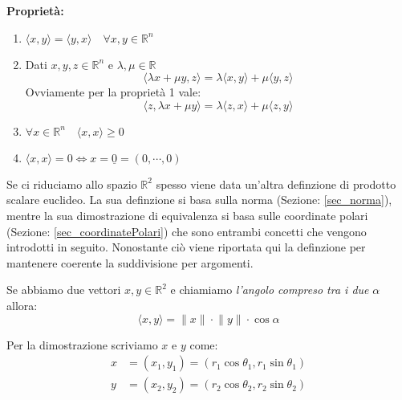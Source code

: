 \textbf{Proprietà:}
\begin{enumerate}
	\item $\langle x, y \rangle = \langle y, x \rangle \quad \forall x, y \in \mathbb{R}^n$

	\item Dati $x, y, z \in \mathbb{R}^n$ e $\lambda, \mu \in \mathbb{R}$ 
		\begin{equation*}
			\langle \lambda x + \mu y, z \rangle = \lambda \langle x, y \rangle + \mu \langle y, z \rangle
		\end{equation*}
		Ovviamente per la proprietà 1 vale:
		\begin{equation*}
			\langle z, \lambda x + \mu y \rangle = \lambda \langle z, x \rangle + \mu \langle z, y \rangle
		\end{equation*}

	\item $\forall x \in \mathbb{R}^n \quad \langle x, x \rangle \geq 0$
	
	\item $\langle x, x \rangle = 0 \iff x = \underline{0} = (0, \cdots, 0)$
\end{enumerate}

Se ci riduciamo allo spazio $\mathbb{R}^2$ spesso viene data un'altra definzione di prodotto scalare euclideo. La sua definzione si basa sulla norma (Sezione: \ref{sec_norma}), mentre la sua dimostrazione di equivalenza si basa sulle coordinate polari (Sezione: \ref{sec_coordinatePolari}) che sono entrambi concetti che vengono introdotti in seguito. Nonostante ciò viene riportata qui la definzione per mantenere coerente la suddivisione per argomenti. 

Se abbiamo due vettori $x, y \in \mathbb{R}^2$ e chiamiamo \textit{l'angolo compreso tra i due} $\alpha$ allora:
\begin{equation*}
	\langle x, y \rangle = \lVert x \rVert \cdot \lVert y \rVert \cdot \cos{\alpha}
\end{equation*}

Per la dimostrazione scriviamo $x$ e $y$ come:
\begin{align*}
	x &= (x_1, y_1) = (r_1\cos{\theta_1}, r_1\sin{\theta_1}) \\
	y &= (x_2, y_2) = (r_2\cos{\theta_2}, r_2\sin{\theta_2})
\end{align*}

